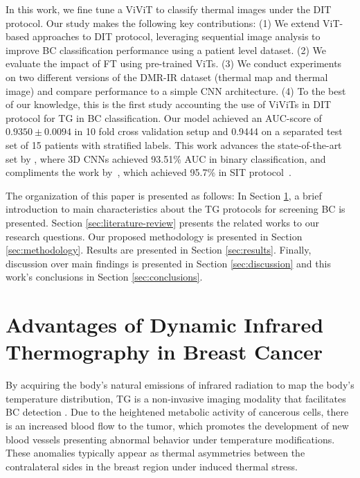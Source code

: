 \documentclass[runningheads]{llncs}
\begin{document}
In this work, we fine tune a \ac{ViViT} to classify thermal images
under the \ac{DIT} protocol. Our study makes the following key
contributions: (1) We extend \ac{ViT}-based approaches to \ac{DIT}
protocol, leveraging sequential image analysis to improve \ac{BC}
classification performance using a patient level dataset. (2) We
evaluate the impact of \ac{FT} using pre-trained \ac{ViTs}. (3) We
conduct experiments on two different versions of the DMR-IR dataset
(thermal map and thermal image) and compare performance to a simple
CNN architecture. (4) To the best of our knowledge, this is the first
study accounting the use of \ac{ViViTs} in \ac{DIT} protocol for
\ac{TG} in \ac{BC} classification. Our model achieved an
\ac{AUC}-score of $0.9350 \pm 0.0094$ in 10 fold cross validation
setup and 0.9444 on a separated test set of 15 patients with stratified
labels. This work advances the state-of-the-art set by
\cite{DeMatheus2023}, where 3D \ac{CNNs} achieved 93.51\% \ac{AUC} in
binary classification, and compliments the work by~\cite{Garia2023},
which achieved 95.7\% in \ac{SIT} protocol~\cite{Silva2014,VisualLab2014}.

The organization of this paper is presented as follows: In Section
\ref{sec:thermography}, a brief introduction to main characteristics
about the \ac{TG} protocols for screening BC is presented. Section
\ref{sec:literature-review} presents the related works to our research
questions. Our proposed methodology is presented in Section
\ref{sec:methodology}. Results are presented in Section
\ref{sec:results}. Finally, discussion over main findings is presented
in Section \ref{sec:discussion} and this work's conclusions in Section
\ref{sec:conclusions}.%

\section{Advantages of Dynamic Infrared Thermography in Breast Cancer}
\label{sec:thermography}
By acquiring the body's natural emissions of infrared radiation to map
the body's temperature distribution, \ac{TG} is a non-invasive imaging
modality that facilitates BC detection
\cite{Kennedy2009,Rakhunde2022,tsietso2022review}. Due to the
heightened metabolic activity of cancerous cells, there is an
increased blood flow to the tumor, which promotes the development of
new blood vessels presenting abnormal behavior under temperature
modifications. These anomalies typically appear as thermal
asymmetries between the contralateral sides in the breast region under
induced thermal stress. 
\end{document}
